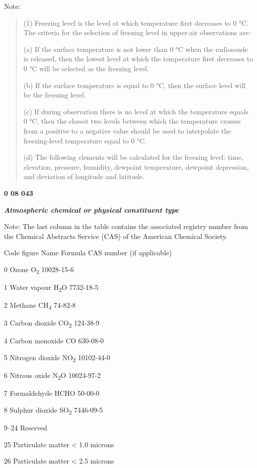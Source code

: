Note:

\begin{quote}
(1) Freezing level is the level at which temperature first decreases to 0 °C. The criteria for the selection of freezing level in upper-air observations are:

(a) If the surface temperature is not lower than 0 °C when the radiosonde is released, then the lowest level at which the temperature first decreases to 0 °C will be selected as the freezing level.

(b) If the surface temperature is equal to 0 °C, then the surface level will be the freezing level.

(c) If during observation there is no level at which the temperature equals 0 °C, then the closest two levels between which the temperature crosses from a positive to a negative value should be used to interpolate the freezing-level temperature equal to 0 °C.

(d) The following elements will be calculated for the freezing level: time, elevation, pressure, humidity, dewpoint temperature, dewpoint depression, and deviation of longitude and latitude.
\end{quote}

\textbf{0 08 043}

\emph{\textbf{Atmospheric chemical or physical constituent type}}

Note: The last column in the table contains the associated registry number from the Chemical Abstracts Service (CAS) of the American Chemical Society.

Code figure Name Formula CAS number (if applicable)

0 Ozone O\textsubscript{3} 10028-15-6

1 Water vapour H\textsubscript{2}O 7732-18-5

2 Methane CH\textsubscript{4} 74-82-8

3 Carbon dioxide CO\textsubscript{2} 124-38-9

4 Carbon monoxide CO 630-08-0

5 Nitrogen dioxide NO\textsubscript{2} 10102-44-0

6 Nitrous oxide N\textsubscript{2}O 10024-97-2

7 Formaldehyde HCHO 50-00-0

8 Sulphur dioxide SO\textsubscript{2} 7446-09-5

9--24 Reserved

25 Particulate matter \textless{} 1.0 microns

26 Particulate matter \textless{} 2.5 microns

